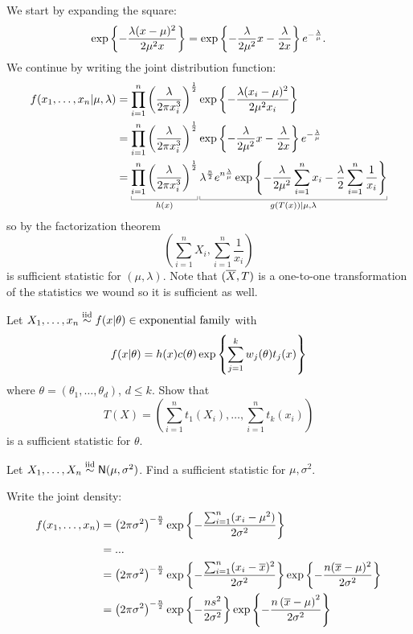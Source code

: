 We start by expanding the square:
\begin{align*}
	\exp\left\{-\frac{\lambda(x-\mu)^{2}}{2\mu^{2}x}\right\}=\exp\left\{-\frac{\lambda}{2\mu^{2}}x-\frac{\lambda}{2x}\right\}e^{-\frac{\lambda}{\mu}}.
\end{align*}
We continue by writing the joint distribution function:
\begin{align*}
	f(x_{1},\ldots,x_{n}|\mu,\lambda)&=\prod_{i=1}^{n}\left(\frac{\lambda}{2\pi x_{i}^{3}}\right)^{\unmezz}\expg{-\frac{\lambda (x_{i}-\mu)^{2}}{2\mu^{2}x_{i}}}\\
	&=\prod_{i=1}^{n}\left(\frac{\lambda}{2\pi x_{i}^{3}}\right)^{\unmezz}\expg{-\frac{\lambda}{2\mu^{2}}x-\frac{\lambda}{2x}}e^{-\frac{\lambda}{\mu}}\\
	&=\ubracketthin{\prod_{i=1}^{n}\left(\frac{\lambda}{2\pi x_{i}^{3}}\right)^{\unmezz}}_{h(x)}\ubracketthin{\lambda^{\frac{n}{2}}e^{n\frac{\lambda}{\mu}}\expg{-\frac{\lambda}{2\mu^{2}}\sum_{i=1}^{n}x_{i}-\frac{\lambda}{2}\sum_{i=1}^{n}\frac{1}{x_{i}}}}_{g(T(x))|\mu,\lambda}\\
\end{align*}
so by the factorization theorem 
\begin{equation*}
	\left(\sum_{i=1}^{n}X_{i},\sum_{i=1}^{n}\frac{1}{x_{i}}\right)
\end{equation*}
is  sufficient statistic for $(\mu,\lambda)$. Note that $(\overline{X}, T)$ is a one-to-one transformation of the statistics we wound so it is sufficient as well.
\begin{homework}
	Let $X_{1},\ldots,x_{n}\stackrel{\mathrm{iid}}{\sim} f(x|\theta)\in\text{exponential family}$ with
\begin{equation*}
	f(x|\theta)=h(x)c(\theta)\exp\left\{\sum_{j=1}^{k}w_{j}(\theta)t_{j}(x)\right\}
\end{equation*} 
where $\theta=(\theta_{1},\ldots,\theta_{d})$, $d\leq k$. Show that 
\begin{equation*}
	T(X)=\left(\sum_{i=1}^{n}t_{1}(X_{i}),\ldots,\sum_{i=1}^{n}t_{k}(x_{i})\right)
\end{equation*}
is a sufficient statistic for $\theta$.
\end{homework}
\begin{exercise}
	Let $X_{1},\ldots,X_{n}\stackrel{\mathrm{iid}}{\sim}\mathsf{N}(\mu,\sigma^{2})$. Find a sufficient statistic for $\mu,\sigma^{2}$.
\end{exercise}
Write the joint density:
\begin{align*}
	f(x_{1},\ldots,x_{n})&=\left(2\pi\sigma^{2}\right)^{-\frac{n}{2}}\exp\left\{-\frac{\sum_{i=1}^{n}(x_{i}-\mu^{2})}{2\sigma^{2}}\right\}\\
	&=...\\
	&=\left(2\pi\sigma^{2}\right)^{-\frac{n}{2}}\exp\left\{-\frac{\sum_{i=1}^{n}(x_{i}-\overline{x})^{2}}{2\sigma^{2}}\right\}\exp\left\{-\frac{n(\overline{x}-\mu)^{2}}{2\sigma^{2}}\right\}\\
	&=\left(2\pi\sigma^{2}\right)^{-\frac{n}{2}}\exp\left\{-\frac{ns^{2}}{2\sigma^{2}}\right\}\exp\left\{-\frac{n\left(\overline{x}-\mu\right)^{2}}{2\sigma^{2}}\right\}
\end{align*}
